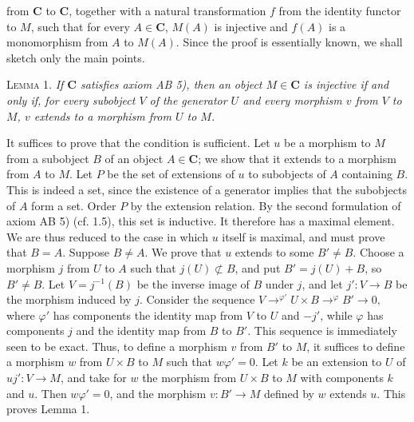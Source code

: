 
\noindent from $\mathbf{C}$ to $\mathbf{C}$, together with a natural transformation $f$ from
the identity functor to $M$, such that for every $A\in \mathbf{C}$, $M(A)$ is injective
and $f(A)$ is a monomorphism from $A$ to $M(A)$. Since the proof is
essentially known, we shall sketch only the main points.

\textsc{Lemma 1.} \textit{If $\mathbf{C}$ satisfies axiom \textup{AB 5)}, then an
object $M\in \mathbf{C}$ is injective if and only if, for every subobject $V$ of the
generator $U$ and every morphism $v$ from $V$ to $M$, $v$ extends to a
morphism from $U$ to $M$.}

It suffices to prove that the condition is sufficient. Let $u$ be a morphism
to $M$ from a subobject $B$ of an object $A\in \mathbf{C}$; we show that it extends to
a morphism from $A$ to $M$. Let $P$ be the set of extensions of $u$ to
subobjects of $A$ containing $B$. This is indeed a set, since the existence of
a generator implies that the subobjects of $A$ form a set. Order $P$ by the
extension relation. By the second formulation of axiom AB 5) (cf. 1.5), this
set is inductive. It therefore has a maximal element. We are thus reduced to
the case in which $u$ itself is maximal, and must prove that $B=A$.
Suppose $B\neq A$. We prove that $u$ extends to some $B'\neq B$. Choose a
morphism $j$ from $U$ to $A$ such that $j(U)\not\subset B$, and put
$B'=j(U)+B$, so $B'\neq B$. Let $V=j^{-1}(B)$ be the inverse image of $B$
under $j$, and let $j':V\to B$ be the morphism induced by $j$.
Consider the sequence
$V\mathrel{\mathop{\to}^{\varphi'}}U\times B  \mathrel{\mathop{\to}^{\varphi}}B'\to0,$ where $\varphi'$ has components the identity map from $V$ to $U$
and $-j'$, while $\varphi$ has components $j$ and the identity map from $B$
to $B'$. This sequence is immediately seen to be exact. Thus, to define a
morphism $v$ from $B'$ to $M$, it suffices to define a morphism $w$ from
$U\times B$ to $M$ such that $w\varphi'=0$. Let $k$ be an extension to $U$ of
$uj':V\to M$, and take for $w$ the morphism from $U\times B$ to
$M$ with components $k$ and $u$. Then $w\varphi'=0$, and the morphism
$v:B'\to M$ defined by $w$ extends $u$. This proves Lemma 1.

